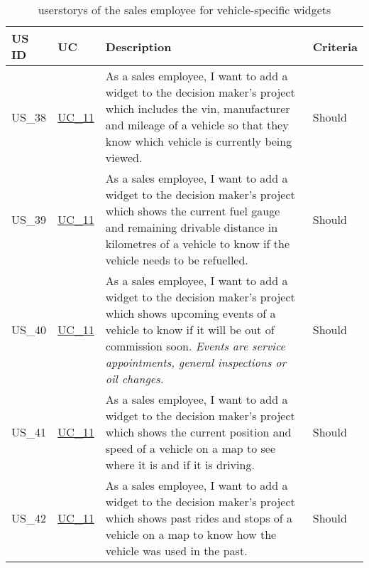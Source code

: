   \sffamily
  \begin{footnotesize}
    \begin{longtable}[L L L]{ p{} p{} p{} p{} }
      \caption                       %
          {\Glspl{userstory} of the sales employee for vehicle-specific \glspl{widget}} %
          \label{FahrzeugWidgets}      
          \\
      \toprule
      \textbf{US ID} & \textbf{UC} & \textbf{Description} & \textbf{Criteria} \\
      \midrule
      \hypertarget{Ref:US38}{US\_38} & \hyperlink{Ref:UC11}{UC\_11} & As a sales employee, I want to add a \gls{widget} to the decision maker's project which includes the \gls{vin}, manufacturer and mileage of a vehicle so that they know which vehicle is currently being viewed. & Should \\
      
      \rowcolor{Gray}
      \hypertarget{Ref:US39}{US\_39} & \hyperlink{Ref:UC11}{UC\_11} & As a sales employee, I want to add a \gls{widget} to the decision maker's project which shows the current fuel gauge and remaining drivable distance in kilometres of a vehicle to know if the vehicle needs to be refuelled. & Should \\
      
      \hypertarget{Ref:US40}{US\_40} & \hyperlink{Ref:UC11}{UC\_11} & As a sales employee, I want to add a \gls{widget} to the decision maker's project which shows upcoming events of a vehicle to know if it will be out of commission soon.
      \newline
      \emph{Events are service appointments, general inspections or oil changes.} & Should \\
      
      \rowcolor{Gray}
      \hypertarget{Ref:US41}{US\_41} & \hyperlink{Ref:UC11}{UC\_11} & As a sales employee, I want to add a \gls{widget} to the decision maker's project which shows the current position and speed of a vehicle on a map to see where it is and if it is driving. & Should \\
      
      \hypertarget{Ref:US42}{US\_42} & \hyperlink{Ref:UC11}{UC\_11} & As a sales employee, I want to add a \gls{widget} to the decision maker's project which shows past rides and stops of a vehicle on a map to know how the vehicle was used in the past. & Should \\
      

\end{longtable}
\end{footnotesize}
